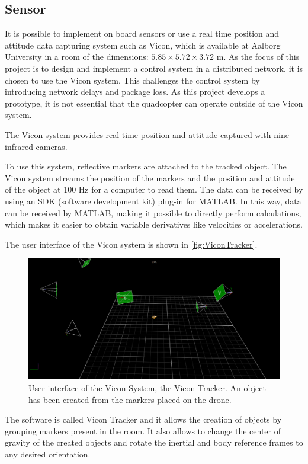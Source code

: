 \subsection{Sensor}
It is possible to implement on board sensors or use a real time position and attitude data capturing system such as Vicon, which is available at Aalborg University in a room of the dimensions: $5.85 \times 5.72 \times 3.72$ \si{m}.
As the focus of this project is to design and implement a control system in a distributed network, it is chosen to use the Vicon system. This challenges the control system by introducing network delays and package loss. As this project develops a prototype, it is not essential that the quadcopter can operate outside of the Vicon system.

The Vicon system provides real-time position and attitude captured with nine infrared cameras.
%

To use this system, reflective markers are attached to the tracked object. The Vicon system streams the position of the markers and the position and attitude of the object at 100 Hz for a computer to read them. The data can be received by using an SDK (software development kit) plug-in for MATLAB. In this way, data can be received by MATLAB, making it possible to directly perform calculations, which makes it easier to obtain variable derivatives like velocities or accelerations.

The user interface of the Vicon system is shown in \autoref{fig:ViconTracker}. 
\begin{figure}[H]
	\centering
	\includegraphics[scale=0.27]{figures/ViconTracker}
	\caption{User interface of the Vicon System, the Vicon Tracker. An object has been created from the markers placed on the drone.}
	\label{fig:ViconTracker}
\end{figure}
%
The software is called Vicon Tracker and it allows the creation of objects by grouping markers present in the room. It also allows to change the center of gravity of the created objects and rotate the inertial and body reference frames to any desired orientation.

